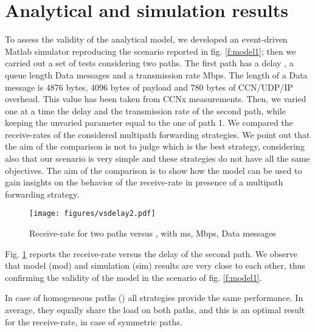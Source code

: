 \documentclass{sig-alternate-10pt}
\begin{document}
\section{Analytical and simulation results}
\label{s:Analytical and simulation results}
To assess the validity of the analytical model, we developed an event-driven Matlab simulator reproducing the scenario reported in fig. \ref{f:model1}; then we carried out a set of tests considering two paths. The first path has a delay , a queue length  Data messages and a transmission rate  Mbps. The length of a Data message is 4876 bytes, 4096 bytes of payload and 780 bytes of CCN/UDP/IP overhead. This value has been taken from CCNx measurements. Then, we varied one at a time the delay  and the transmission rate  of the second path, while keeping the unvaried parameter equal to the one of path 1.
We compared the receive-rates of the considered multipath forwarding strategies. We point out that the aim of the comparison is not to judge which is the best strategy, considering also that our scenario is very simple and these strategies do not have all the same objectives. The aim of the comparison is to show how the model can be used to gain insights on the behavior of the receive-rate in presence of a multipath forwarding strategy.        

\begin{figure}[t]
\centering
\texttt{[image: figures/vsdelay2.pdf]}
\caption{Receive-rate  for two paths versus , with  ms,  Mbps,  Data messages}
\label{f:vsdelay}
\vspace{-10pt}
\end{figure}

Fig. \ref{f:vsdelay} reports the receive-rate versus the delay of the second path. We observe that model (mod) and simulation (sim) results are very close to each other, thus confirming the validity of the model in the scenario of fig. \ref{f:model1}.

In case of homogeneous paths () all strategies provide the same performance. In average, they equally share the load on both paths, and this is an optimal result for the receive-rate, in case of symmetric paths.
\end{document}
